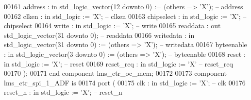 \begin{DoxyCode}
00161             address    : \textcolor{keywordflow}{in}  \textcolor{comment}{std\_logic\_vector}(\textcolor{vhdllogic}{}\textcolor{vhdllogic}{12} \textcolor{keywordflow}{downto} \textcolor{vhdllogic}{}\textcolor{vhdllogic}{0}) := (\textcolor{keywordflow}{others} => 'X'); \textcolor{keyword}{-- address}
00162             clken      : \textcolor{keywordflow}{in}  \textcolor{comment}{std\_logic}                     := 'X';             \textcolor{keyword}{-- clken}
00163             chipselect : \textcolor{keywordflow}{in}  \textcolor{comment}{std\_logic}                     := 'X';             \textcolor{keyword}{-- chipselect}
00164             write      : \textcolor{keywordflow}{in}  \textcolor{comment}{std\_logic}                     := 'X';             \textcolor{keyword}{-- write}
00165             readdata   : \textcolor{keywordflow}{out} \textcolor{comment}{std\_logic\_vector}(\textcolor{vhdllogic}{}\textcolor{vhdllogic}{31} \textcolor{keywordflow}{downto} \textcolor{vhdllogic}{}\textcolor{vhdllogic}{0});                    \textcolor{keyword}{-- readdata}
00166             writedata  : \textcolor{keywordflow}{in}  \textcolor{comment}{std\_logic\_vector}(\textcolor{vhdllogic}{}\textcolor{vhdllogic}{31} \textcolor{keywordflow}{downto} \textcolor{vhdllogic}{}\textcolor{vhdllogic}{0}) := (\textcolor{keywordflow}{others} => 'X'); \textcolor{keyword}{-- writedata}
00167             byteenable : \textcolor{keywordflow}{in}  \textcolor{comment}{std\_logic\_vector}(\textcolor{vhdllogic}{}\textcolor{vhdllogic}{3} \textcolor{keywordflow}{downto} \textcolor{vhdllogic}{}\textcolor{vhdllogic}{0})  := (\textcolor{keywordflow}{others} => 'X'); \textcolor{keyword}{-- byteenable}
00168             reset      : \textcolor{keywordflow}{in}  \textcolor{comment}{std\_logic}                     := 'X';             \textcolor{keyword}{-- reset}
00169             reset\_req  : \textcolor{keywordflow}{in}  \textcolor{comment}{std\_logic}                     := 'X'              \textcolor{keyword}{-- reset\_req}
00170         );
00171     \textcolor{keywordflow}{end} \textcolor{keywordflow}{component} \textcolor{vhdlchar}{lms_ctr_oc_mem};
00172 
00173     \textcolor{keywordflow}{component} lms\_ctr\_spi\_1\_ADF \textcolor{keywordflow}{is}
00174         \textcolor{keywordflow}{port} (
00175             clk           : \textcolor{keywordflow}{in}  \textcolor{comment}{std\_logic}                     := 'X';             \textcolor{keyword}{-- clk}
00176             reset\_n       : \textcolor{keywordflow}{in}  \textcolor{comment}{std\_logic}                     := 'X';             \textcolor{keyword}{-- reset\_n}

\end{DoxyCode}
